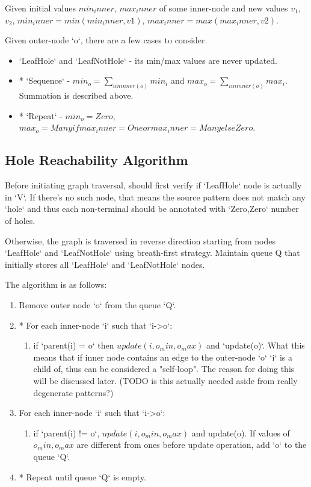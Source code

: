 Given initial values $min_inner$, $max_inner$ of some inner-node  and new values $v_1$, $v_2$, $min_inner = min(min_inner, v1)$, $max_inner = max(max_inner, v2)$.


Given outer-node `o`, there are a few cases to consider.

\begin{itemize}
\item
`LeafHole` and `LeafNotHole` - its min/max values are never updated.
\item
* `Sequence` - $min_o = \sum_{i in inner(o)} min_i$ and $max_o = \sum_{i in inner(o)} max_i$. Summation is described above.
\item
* `Repeat` - $min_o = Zero$, $max_o = Many if max_inner = One or max_inner = Many else Zero$.
\end{itemize}

\subsection{Hole Reachability Algorithm}

Before initiating graph traversal, should first verify if `LeafHole` node is actually in `V`. If there's no such node, that means the source pattern does not match any `hole` and thus each non-terminal should be annotated with `Zero,Zero` number of holes.

Otherwise, the graph is traversed in reverse direction starting from nodes `LeafHole` and `LeafNotHole` using breath-first strategy. Maintain queue Q that initially stores all `LeafHole` and `LeafNotHole` nodes.

The algorithm is as follows:
\begin{enumerate}
\item
Remove outer node `o` from the queue `Q`. 
\item
* For each inner-node `i` such that `i->o`:
	\begin{enumerate}
	\item
	if `parent(i) = o` then $update(i, o_min, o_max)$ and `update(o)`. What this means that if inner node contains an edge to the outer-node `o` `i` is a child of, thus can be considered a "self-loop". The reason for doing this will be discussed later. (TODO is this actually needed aside from really degenerate patterns?)
	\end{enumerate}

\item
For each inner-node `i` such that `i->o`:
	\begin{enumerate}
	\item
	if `parent(i) != o`, $update(i, o_min, o_max)$ and update(o). If values of $o_min, o_max$ are different from ones before update operation, add `o` to the queue `Q`.
	\end{enumerate}

\item
* Repeat until queue `Q` is empty.

\end{enumerate}


